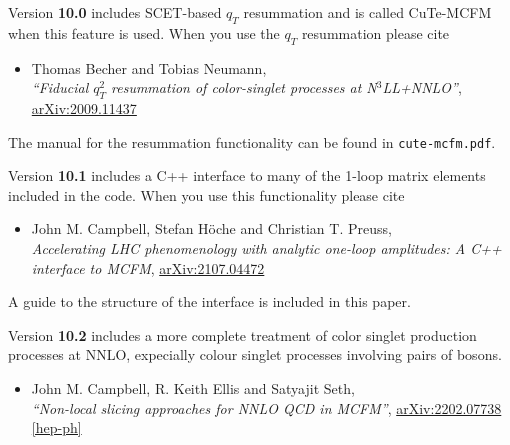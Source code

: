 Version \textbf{10.0} includes SCET-based $q_T$ resummation and is called CuTe-MCFM when this
feature is used. When you use the $q_T$ resummation please cite
\begin{itemize}
\item Thomas Becher and Tobias Neumann,\\
{\it ``Fiducial $q_T^2$ resummation of color-singlet processes at N$^3$LL+NNLO''},
\href{https://arxiv.org/abs/2009.11437}{arXiv:2009.11437}
\end{itemize}
The manual for the resummation functionality can be found in \texttt{cute-mcfm.pdf}.

Version \textbf{10.1} includes a C++ interface to many of the 1-loop matrix elements
included in the code. When you use this functionality please cite
\begin{itemize}
\item
  John M. Campbell, Stefan H{\"o}che and Christian T. Preuss,\\
  {\it Accelerating LHC phenomenology with analytic one-loop amplitudes: A C++ interface to MCFM},
  \href{https://arxiv.org/abs/2107.04472}{arXiv:2107.04472}
\end{itemize}
A guide to the structure of the interface is included in this paper.

Version \textbf{10.2} includes a more complete treatment of color singlet production
processes at NNLO, expecially colour singlet processes involving pairs of bosons.
\begin{itemize}
\item
    John M. Campbell, R. Keith Ellis and Satyajit Seth,\\
    {\it ``Non-local slicing approaches for NNLO QCD in MCFM''},
    \href{https://arxiv.org/abs/2202.07738}{arXiv:2202.07738 [hep-ph]}
\end{itemize}
